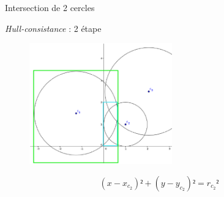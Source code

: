 \documentclass[frames,pdf,slideColor,colorBG,accumulate,total]{prosper}
\begin{document}
{\begin{slide}[Box]{Intersection de 2 cercles}
{    \emph{Hull-consistance} : 2 étape
      \begin{figure}[t]
        \begin{center}
          \includegraphics[width=0.55\textwidth]{img/hull2}
        \end{center}
      \end{figure}
   \begin{equation*}
       (x-x_{c_2})²+(y-y_{c_2})² = r_{c_2}²
    \end{equation*}
    }
  \end{slide}
}
 
\end{document}
